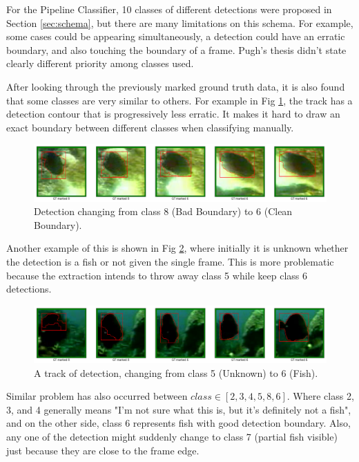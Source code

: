 \documentclass[bsc,logo,twoside,fullspacing,parskip]{infthesis}
\begin{document}
For the Pipeline Classifier, 10 classes of different detections were proposed in Section \ref{sec:schema}, but there are many limitations on this schema.
For example, some cases could be appearing simultaneously, a detection could have an erratic boundary, and also touching the boundary of a frame. Pugh's thesis didn't state clearly different priority among classes used. 

After looking through the previously marked ground truth data, it is also found that some classes are very similar to others. For example in Fig \ref{fig:class68}, the track has a detection contour that is progressively less erratic. It makes it hard to draw an exact boundary between different classes when classifying manually.

\begin{figure}[h]
\centering
    \includegraphics[scale=0.34]{graph/6-8.png}
    \caption{Detection changing from class 8 (Bad Boundary) to 6 (Clean Boundary).}
    \label{fig:class68}
\end{figure}

Another example of this is shown in Fig \ref{fig:class56}, where initially it is unknown whether the detection is a fish or not given the single frame. This is more problematic because the extraction intends to throw away class 5 while keep class 6 detections. 

\begin{figure}[ht]
\centering
    \includegraphics[scale=0.34]{graph/5-6.png}
    \caption{A track of detection, changing from class 5 (Unknown) to 6 (Fish).}
    \label{fig:class56}
\end{figure}

Similar problem has also occurred between \(class\in[2,3,4,5,8,6]\). Where class 2, 3, and 4 generally means "I'm not sure what this is, but it's definitely not a fish", and on the other side, class 6 represents fish with good detection boundary. 
Also, any one of the detection might suddenly change to class 7 (partial fish visible) just because they are close to the frame edge. 
\end{document}

